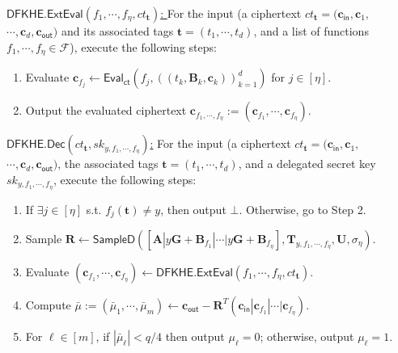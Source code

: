 \documentclass[runningheads,10pt]{llncs}
\begin{document}
\begin{description}
\fi	
	
	\item \underline{$\textsf{DFKHE.ExtEval}(f_1,\cdots, f_\eta, ct_\mathbf{t})$: }
	For the input (a ciphertext $ct_\mathbf{t}=(\textbf{c}_{\textsf{in}}, \textbf{c}_1, $ $ \cdots, \textbf{c}_{d}, \textbf{c}_{\textsf{out}}) $ and its associated tags $\textbf{t}=(t_1, \cdots, t_d)$, 
	and a list of functions $f_1,\cdots, f_\eta \in \mathcal{F}$), execute the following steps:
	\begin{enumerate}
	
		\item Evaluate $\textbf{c}_{f_j}\leftarrow \textsf{Eval}_\textsf{ct}(f_j,  ((t_k, \textbf{B}_k, \textbf{c}_{k}))_{k=1}^{d})$ for $j\in[\eta]$.
		\item Output the evaluated ciphertext $\textbf{c}_{f_1,\cdots, f_\eta}:=(\textbf{c}_{f_1},\cdots, \textbf{c}_{f_\eta})$.
	
	\end{enumerate}  

	
	
	\item \underline{$\textsf{DFKHE.Dec}(ct_\mathbf{t}, sk_{y,f_1,\cdots, f_\eta} )$:} 
	For the input (a ciphertext $ct_\mathbf{t}=(\textbf{c}_{\textsf{in}}, \textbf{c}_1, $ $ \cdots, \textbf{c}_{d}, \textbf{c}_{\textsf{out}}) $, 
	the associated tags $\textbf{t}=(t_1, \cdots, t_d)$, 
	and a delegated secret key $sk_{y,f_1,\cdots, f_\eta}$, execute the following steps:
	\begin{enumerate}
		\item If  $\exists j\in [\eta]$ s.t. $f_{j}(\mathbf{t}) \neq y$, then output $\bot$. Otherwise, go to Step 2.
		\item Sample $\textbf{R} \leftarrow \textsf{SampleD}([\textbf{A} |y\mathbf{G}+\textbf{B}_{f_{1}}|\cdots |y\mathbf{G}+\textbf{B}_{f_{\eta}}], \textbf{T}_{y,f_1,\cdots, f_{\eta}}, \textbf{U}, \sigma_\eta)$.
		\item Evaluate  $(\textbf{c}_{f_1},\cdots, \textbf{c}_{f_\eta}) \leftarrow \textsf{DFKHE.ExtEval}(f_1,\cdots, f_\eta, ct_\mathbf{t})$.
		\item Compute $\bar{\mu}:=(\bar{\mu}_1,\cdots, \bar{\mu}_m) \leftarrow \textbf{c}_{\textsf{out}}-\textbf{R}^T(\textbf{c}_\textsf{in}|\textbf{c}_{f_{1}}|\cdots|\textbf{c}_{f_\eta})$.
		\item For $\ell \in [m]$,  if $ |\bar{\mu}_\ell | <q/4$ then output $\mu_\ell=0$;  otherwise, output $\mu_\ell=1$.
	\end{enumerate}  
\end{description}
\end{document}
